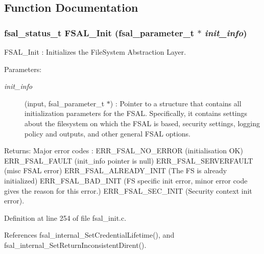 \subsection{Function Documentation}
\subsubsection{\setlength{\rightskip}{0pt plus 5cm}fsal\_\-status\_\-t FSAL\_\-Init (fsal\_\-parameter\_\-t $\ast$ {\em init\_\-info})}\label{fsal__init_8c_a7}


FSAL\_\-Init : Initializes the File\-System Abstraction Layer.

\begin{Desc}
\item[Parameters:]
\begin{description}
\item[{\em init\_\-info}](input, fsal\_\-parameter\_\-t $\ast$) : Pointer to a structure that contains all initialization parameters for the FSAL. Specifically, it contains settings about the filesystem on which the FSAL is based, security settings, logging policy and outputs, and other general FSAL options.\end{description}
\end{Desc}
\begin{Desc}
\item[Returns:]Major error codes : ERR\_\-FSAL\_\-NO\_\-ERROR (initialisation OK) ERR\_\-FSAL\_\-FAULT (init\_\-info pointer is null) ERR\_\-FSAL\_\-SERVERFAULT (misc FSAL error) ERR\_\-FSAL\_\-ALREADY\_\-INIT (The FS is already initialized) ERR\_\-FSAL\_\-BAD\_\-INIT (FS specific init error, minor error code gives the reason for this error.) ERR\_\-FSAL\_\-SEC\_\-INIT (Security context init error). \end{Desc}


Definition at line 254 of file fsal\_\-init.c.

References fsal\_\-internal\_\-Set\-Credential\-Lifetime(), and fsal\_\-internal\_\-Set\-Return\-Inconsistent\-Dirent().